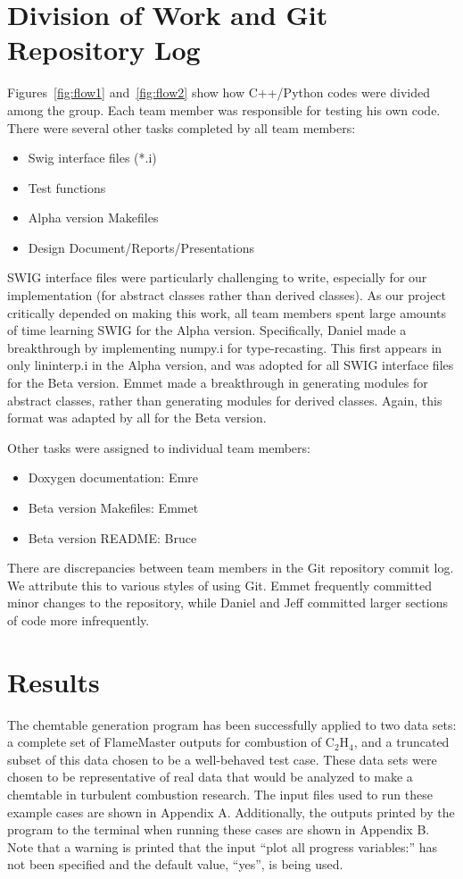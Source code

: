 \documentclass[11pt]{article}
\begin{document}
\section{Division of Work and Git Repository Log}
Figures~\ref{fig:flow1} and~\ref{fig:flow2} show how C++/Python codes were
divided among the group. Each team member was responsible for testing
his own code. There were several other tasks completed by all team members:
\begin{itemize}
\item Swig interface files (*.i)
\item Test functions
\item Alpha version Makefiles
\item Design Document/Reports/Presentations
\end{itemize}
SWIG interface files were particularly challenging to write,
especially for our implementation (for abstract classes rather than
derived classes). As our project critically depended on making this
work, all team members spent large amounts of time learning SWIG for
the Alpha version. Specifically, Daniel made a breakthrough by
implementing numpy.i for type-recasting. This first appears in only
lininterp.i in the Alpha version, and was adopted for all SWIG
interface files for the Beta version. Emmet made a breakthrough in
generating modules for abstract classes, rather than generating
modules for derived classes. Again, this format was adapted by all for
the Beta version.

Other tasks were assigned to individual team members:
\begin{itemize}
\item Doxygen documentation: Emre
\item Beta version Makefiles: Emmet
\item Beta version README: Bruce
\end{itemize}

There are discrepancies between team members in the Git repository
commit log. We attribute this to various styles of using Git. Emmet
frequently committed minor changes to the repository, while Daniel and
Jeff committed larger sections of code more infrequently.

\section{Results}

The chemtable generation program has been successfully applied to two
data sets: a complete set of FlameMaster outputs for combustion of
C$_2$H$_4$, and a truncated subset of this data chosen to be a
well-behaved test case. These data sets were chosen to be
representative of real data that would be analyzed to make a chemtable
in turbulent combustion research. The input files used to run these
example cases are shown in Appendix A. Additionally, the outputs
printed by the program to the terminal when running these cases are
shown in Appendix B. Note that a warning is printed that the input
``plot all progress variables:'' has not been specified and the default
value, ``yes'', is being used.
\end{document}
